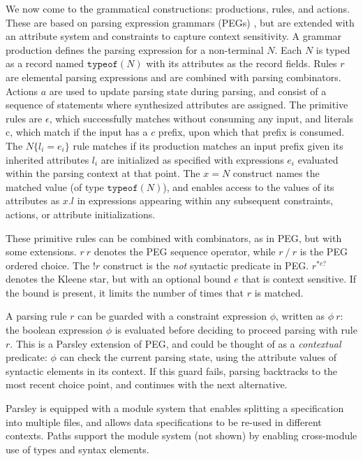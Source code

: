 \documentclass[letterpaper]{article}
\begin{document}
We now come to the grammatical constructions: productions, rules, and
actions.  These are based on parsing expression grammars (PEGs)
\cite{ford2004popl}, but are extended with an attribute system and
constraints to capture context sensitivity.  A grammar production
defines the parsing expression for a non-terminal $N$.  Each $N$ is
typed as a record named $\texttt{typeof}(N)$ with its attributes as
the record fields.  Rules $r$ are elemental parsing expressions and
are combined with parsing combinators.  Actions $a$ are used to update
parsing state during parsing, and consist of a sequence of statements
where synthesized attributes are assigned.  The primitive rules are
$\epsilon$, which successfully matches without consuming any input,
and literals $\textrm{c}$, which match if the input has a $c$ prefix,
upon which that prefix is consumed.  The $N\{l_i=e_i\}$ rule matches
if its production matches an input prefix given its inherited
attributes $l_i$ are initialized as specified with expressions $e_i$
evaluated within the parsing context at that point.  The $x=N$
construct names the matched value (of type $\texttt{typeof}(N)$), and
enables access to the values of its attributes as $x.l$ in expressions
appearing within any subsequent constraints, actions, or attribute
initializations.

These primitive rules can be combined with combinators, as in PEG, but
with some extensions.  $r\ r$ denotes the PEG sequence operator, while
$r\ /\ r$ is the PEG ordered choice.  The $!r$ construct is the
\emph{not} syntactic predicate in PEG.  $r^{*e?}$ denotes the Kleene
star, but with an optional bound $e$ that is context sensitive.  If
the bound is present, it limits the number of times that $r$ is
matched.

A parsing rule $r$ can be guarded with a constraint expression $\phi$,
written as $\phi\ r$: the boolean expression $\phi$ is evaluated
before deciding to proceed parsing with rule $r$.  This is a Parsley
extension of PEG, and could be thought of as a \emph{contextual}
predicate: $\phi$ can check the current parsing state, using the
attribute values of syntactic elements in its context.  If this guard
fails, parsing backtracks to the most recent choice point, and
continues with the next alternative.

Parsley is equipped with a module system that enables splitting a
specification into multiple files, and allows data specifications to
be re-used in different contexts.  Paths support the module system
(not shown) by enabling cross-module use of types and syntax elements.
\end{document}
